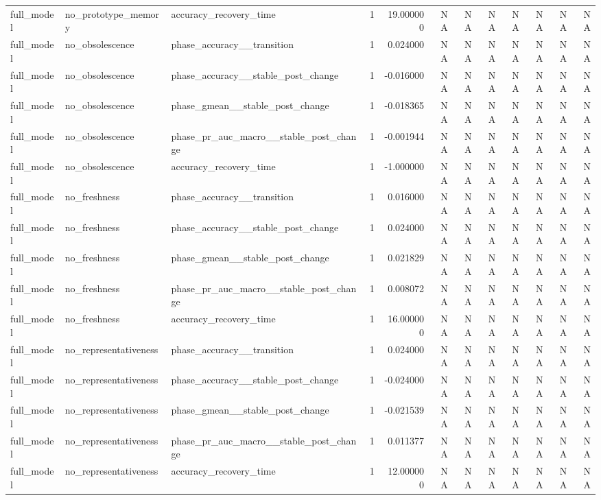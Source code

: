 \begin{tabular}{lllrrrrrrrrr}
full\_model & no\_prototype\_memory & accuracy\_recovery\_time & 1 & 19.000000 & NA & NA & NA & NA & NA & NA & NA \\
full\_model & no\_obsolescence & phase\_accuracy\_\_transition & 1 & 0.024000 & NA & NA & NA & NA & NA & NA & NA \\
full\_model & no\_obsolescence & phase\_accuracy\_\_stable\_post\_change & 1 & -0.016000 & NA & NA & NA & NA & NA & NA & NA \\
full\_model & no\_obsolescence & phase\_gmean\_\_stable\_post\_change & 1 & -0.018365 & NA & NA & NA & NA & NA & NA & NA \\
full\_model & no\_obsolescence & phase\_pr\_auc\_macro\_\_stable\_post\_change & 1 & -0.001944 & NA & NA & NA & NA & NA & NA & NA \\
full\_model & no\_obsolescence & accuracy\_recovery\_time & 1 & -1.000000 & NA & NA & NA & NA & NA & NA & NA \\
full\_model & no\_freshness & phase\_accuracy\_\_transition & 1 & 0.016000 & NA & NA & NA & NA & NA & NA & NA \\
full\_model & no\_freshness & phase\_accuracy\_\_stable\_post\_change & 1 & 0.024000 & NA & NA & NA & NA & NA & NA & NA \\
full\_model & no\_freshness & phase\_gmean\_\_stable\_post\_change & 1 & 0.021829 & NA & NA & NA & NA & NA & NA & NA \\
full\_model & no\_freshness & phase\_pr\_auc\_macro\_\_stable\_post\_change & 1 & 0.008072 & NA & NA & NA & NA & NA & NA & NA \\
full\_model & no\_freshness & accuracy\_recovery\_time & 1 & 16.000000 & NA & NA & NA & NA & NA & NA & NA \\
full\_model & no\_representativeness & phase\_accuracy\_\_transition & 1 & 0.024000 & NA & NA & NA & NA & NA & NA & NA \\
full\_model & no\_representativeness & phase\_accuracy\_\_stable\_post\_change & 1 & -0.024000 & NA & NA & NA & NA & NA & NA & NA \\
full\_model & no\_representativeness & phase\_gmean\_\_stable\_post\_change & 1 & -0.021539 & NA & NA & NA & NA & NA & NA & NA \\
full\_model & no\_representativeness & phase\_pr\_auc\_macro\_\_stable\_post\_change & 1 & 0.011377 & NA & NA & NA & NA & NA & NA & NA \\
full\_model & no\_representativeness & accuracy\_recovery\_time & 1 & 12.000000 & NA & NA & NA & NA & NA & NA & NA \\

\end{tabular}

